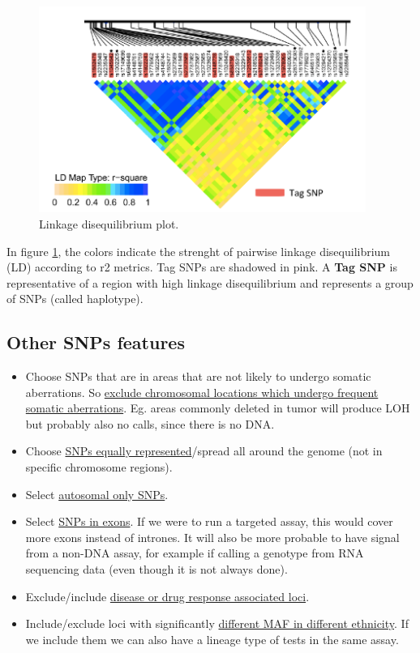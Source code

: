 \begin{figure}[ht]
	\centering
	\includegraphics[width=0.95\textwidth]{LD_plot.PNG}
	\caption{Linkage disequilibrium plot.} 
	\label{fig:LD_plot}
\end{figure}


In figure \ref{fig:LD_plot}, the colors indicate the strenght of pairwise
linkage disequilibrium (LD) according to r2 metrics. Tag SNPs are shadowed in
pink. A \textbf{Tag SNP} is representative of a region with high linkage
disequilibrium and represents a group of SNPs (called haplotype).


\subsection{Other SNPs features} 
\begin{itemize}
	\item Choose SNPs that are in areas that are not likely to undergo somatic
	aberrations. So \underline{exclude chromosomal locations which undergo
	frequent somatic aberrations}. Eg. areas commonly deleted in tumor will
	produce LOH but probably also no calls, since there is no DNA. 
	\item Choose \underline{SNPs equally represented}/spread all around the
	genome (not in specific chromosome regions).
	\item Select \underline{autosomal only SNPs}.
	\item Select \underline{SNPs in exons}. If we were to run a targeted assay,
	this would cover more exons instead of intrones. It will also be more
	probable to have signal from a non-DNA assay, for example if calling a
	genotype from RNA sequencing data (even though it is not always done).
	\item Exclude/include \underline{disease or drug response associated loci}. 
	\item Include/exclude loci with significantly \underline{different MAF in
	different ethnicity}. If we include them we can also have a lineage type of
	tests in the same assay. 
\end{itemize}


